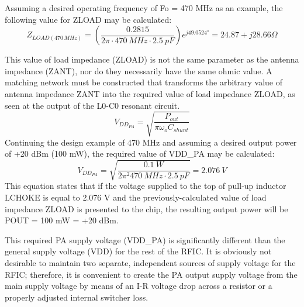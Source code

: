         Assuming a desired operating frequency of Fo = 470 MHz as an example, the following value 
        for ZLOAD may be calculated:
        \begin{equation}\label{EXP001:eq_spirit04}
          Z_{LOAD(470\,MHz)} = 
            \left(\frac{0.2815}{2\pi\cdot\qty{470}{MHz}\cdot\qty{2.5}{pF}}\right)e^{j49.0524°} =
            24.87 + j28.66\Omega
        \end{equation} 
        
        This value of load impedance (ZLOAD) is not the same parameter as the antenna impedance 
        (ZANT), nor do they necessarily have the same ohmic value. A matching network must be 
        constructed that transforms the arbitrary value of antenna impedance ZANT into the required 
        value of load impedance ZLOAD, as seen at the output of the L0-C0 resonant circuit.
        \begin{equation}\label{EXP001:eq_spirit05}
          V_{DD_{PA}} = \sqrt{\frac{P_{out}}{\pi\omega_oC_{shunt}}}
        \end{equation}
        Continuing the design example of 470 MHz and assuming a desired output power of +20 dBm 
        (100 mW), the required value of VDD\_PA may be calculated:
        \begin{equation}\label{EXP001:eq_spirit06}
          V_{DD_{PA}} =\sqrt{\frac{\qty{0.1}{W}}{2\pi^2\qty{470}{MHz}\cdot\qty{2.5}{pF}}} = \qty{2.076}{V}
        \end{equation}
        This equation states that if the voltage supplied to the top of pull-up inductor LCHOKE is 
        equal to 2.076 V and the previously-calculated value of load impedance ZLOAD is presented 
        to the chip, the resulting output power will be POUT = 100 mW = +20 dBm.
        
        This required PA supply voltage (VDD\_PA) is significantly different than the general 
        supply voltage (VDD) for the rest of the RFIC. It is obviously not desirable to maintain 
        two separate, independent sources of supply voltage for the RFIC; therefore, it is 
        convenient to create the PA output supply voltage from the main supply voltage by means of 
        an I-R voltage drop across a resistor or a properly adjusted internal switcher loss.
        
